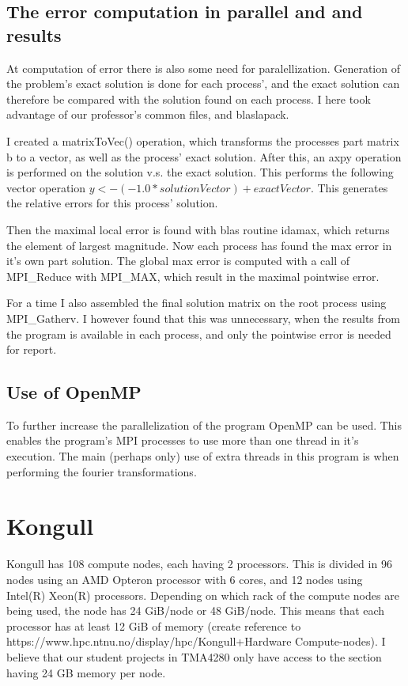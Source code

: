 \subsection{The error computation in parallel and and results}
At computation of error there is also some need for paralellization. Generation of the problem's exact solution is done for each process', and the exact solution can therefore be compared with the solution found on each process. I here took advantage of our professor's common files, and blaslapack. 

I created a matrixToVec() operation, which transforms the processes part matrix b to a vector, as well as the process' exact solution. After this, an axpy operation is performed on the solution v.s. the exact solution. This performs the following vector operation $y <- (-1.0*solutionVector) + exactVector$. This generates the relative errors for this process' solution. 

Then the maximal local error is found with blas routine idamax, which returns the element of largest magnitude. Now each process has found the max error in it's own part solution. The global max error is computed with a call of MPI\_Reduce with MPI\_MAX, which result in the maximal pointwise error.

For a time I also assembled the final solution matrix on the root process using MPI\_Gatherv. I however found that this was unnecessary, when the results from the program is available in each process, and only the pointwise error is needed for report. 

\subsection{Use of OpenMP}
To further increase the parallelization of the program OpenMP can be used. This enables the program's MPI processes to use more than one thread in it's execution. 
The main (perhaps only) use of extra threads in this program is when performing the fourier transformations.


\section{Kongull}
Kongull has 108 compute nodes, each having 2 processors. This is divided in 96 nodes using an AMD Opteron processor with 6 cores, and 12 nodes using Intel(R) Xeon(R) processors. Depending on which rack of the compute nodes are being used, the node has 24 GiB/node or 48 GiB/node. This means that each processor has at least 12 GiB of memory (create reference to https://www.hpc.ntnu.no/display/hpc/Kongull+Hardware Compute-nodes). I believe that our student projects in TMA4280 only have access to the section having 24 GB memory per node. 

